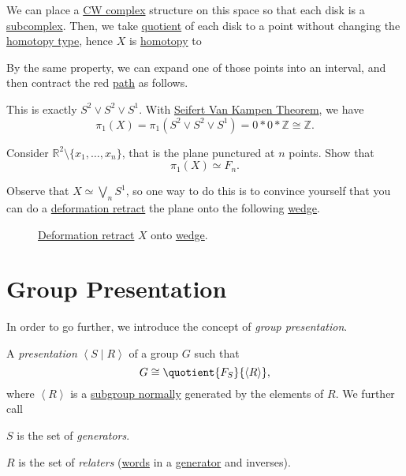 \begin{explanation}
	We can place a \hyperref[def:CW-Complex]{CW complex} structure on this
	space so that each disk is a \hyperref[def:CW-subcomplex]{subcomplex}. Then, we take \hyperref[CW-complex-quotient]{quotient} of each disk
	to a point without changing the \hyperref[def:homotopy-type]{homotopy type}, hence \(X\) is \hyperref[def:homotopy]{homotopy} to
	\begin{figure}[H]
		\centering
		\label{fig:lec11:eg-3:2}
	\end{figure}
	By the same property, we can expand one of those points into an interval, and then contract the red \hyperref[def:path]{path} as follows.
	\begin{figure}[H]
		\centering
		\label{fig:lec11:eg-3:3}
	\end{figure}
	This is exactly \(S^{2} \vee S^{2} \vee S^1\). With \hyperref[thm:Seifert-Van-Kampen-Theorem]{Seifert Van Kampen Theorem}, we have
	\[
		\pi _1(X) = \pi _1(S^{2} \vee S^{2} \vee S^1) = 0\ast 0\ast \mathbb{Z} \cong \mathbb{Z}.
	\]
\end{explanation}
\begin{exercise}
	Consider \(\mathbb{R} ^2 \setminus \{x_1, \ldots , x_n \}\), that is the plane punctured at \(n\) points. Show that
	\[
		\pi _1(X)\simeq F_n.
	\]
\end{exercise}
\begin{answer}
	Observe that \(X \simeq \bigvee_n S^1\), so one way to do this is to convince yourself that you can do a
	\hyperref[def:deformation-retraction]{deformation retract} the plane onto the following \hyperref[CW-complex-wedge-sum]{wedge}.
	\begin{figure}[H]
		\centering
		\caption{\hyperref[def:deformation-retraction]{Deformation retract} \(X\) onto \hyperref[CW-complex-wedge-sum]{wedge}.}
		\label{fig:lec11:ex}
	\end{figure}
\end{answer}

\section{Group Presentation}
In order to go further, we introduce the concept of \emph{group presentation}.
\begin{definition}\label{def:group-presentation}
	A \emph{presentation} \(\left< S \mid R \right> \) of a group \(G\) such that
	\[
		G\cong \quotient{F_S}{\left< R \right>},
	\]
	where \(\left< R \right> \) is a \hyperref[def:normal-subgroup]{subgroup normally} generated by the elements of \(R\). We further call
	\begin{definition}[Generator]\label{def:generator}
		\(S\) is the set of \emph{generators}.
	\end{definition}
	\begin{definition}[Relater]\label{def:relater}
		\(R\) is the set of \emph{relaters} (\hyperref[def:word]{words} in a \hyperref[def:generator]{generator} and inverses).
	\end{definition}
\end{definition}

